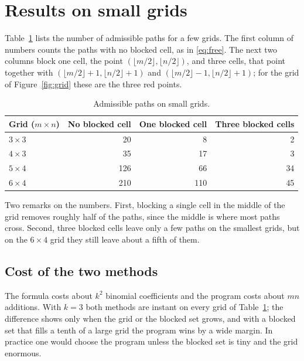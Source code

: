 \documentclass[11pt]{article}
\theoremstyle{definition}
\begin{document}
\section{Results on small grids}
\label{sec:results}

Table~\ref{tab:counts} lists the number of admissible paths for a few grids. The first column of numbers counts the paths with no blocked cell, as in \eqref{eq:free}. The next two columns block one cell, the point $(\lfloor m/2\rfloor,\lfloor n/2\rfloor)$, and three cells, that point together with $(\lfloor m/2\rfloor+1,\lfloor n/2\rfloor+1)$ and $(\lfloor m/2\rfloor-1,\lfloor n/2\rfloor+1)$; for the grid of Figure~\ref{fig:grid} these are the three red points.

\begin{table}[ht]
\centering
\caption{Admissible paths on small grids.}
\label{tab:counts}
\begin{tabular}{lrrr}
\toprule
Grid ($m \times n$) & No blocked cell & One blocked cell & Three blocked cells \\
\midrule
$3 \times 3$ & 20 & 8 & 2 \\
$4 \times 3$ & 35 & 17 & 3 \\
$5 \times 4$ & 126 & 66 & 34 \\
$6 \times 4$ & 210 & 110 & 45 \\
\bottomrule
\end{tabular}
\end{table}

Two remarks on the numbers. First, blocking a single cell in the middle of the grid removes roughly half of the paths, since the middle is where most paths cross. Second, three blocked cells leave only a few paths on the smallest grids, but on the $6 \times 4$ grid they still leave about a fifth of them.

\subsection{Cost of the two methods}
\label{sec:cost}

The formula costs about $k^2$ binomial coefficients and the program costs about $mn$ additions. With $k=3$ both methods are instant on every grid of Table~\ref{tab:counts}; the difference shows only when the grid or the blocked set grows, and with a blocked set that fills a tenth of a large grid the program wins by a wide margin. In practice one would choose the program unless the blocked set is tiny and the grid enormous.
\end{document}
